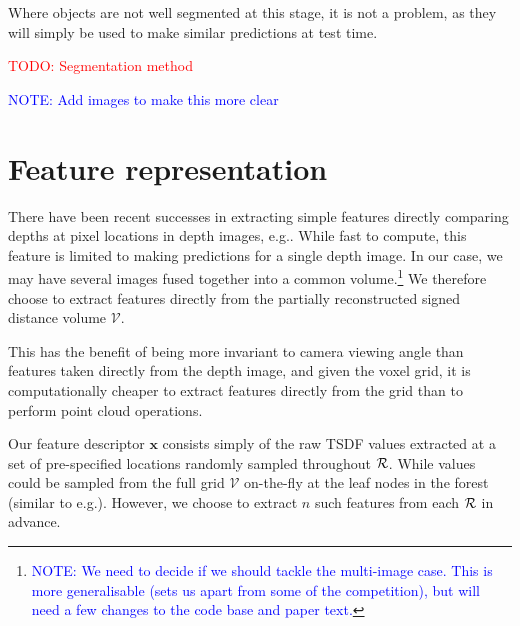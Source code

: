 \documentclass[10pt,twocolumn,letterpaper]{article}
\makeatletter
\renewcommand*{\eg}{e.g.\@\xspace}
\newcommand{\voxelgrid}{\mathcal{V}}
\newcommand{\todo}[1]{\textcolor{red}{TODO: #1}}
\newcommand{\note}[1]{\textcolor{blue}{NOTE: #1}}
\makeatother
\begin{document}
Where objects are not well segmented at this stage, it is not a problem, as they will simply be used to make similar predictions at test time.

\todo{Segmentation method}

\note{Add images to make this more clear}

\section{Feature representation}
\label{sec:features}

\newcommand{\scalfeat}{x}

There have been recent successes in extracting simple features directly comparing depths at pixel locations in depth images, \eg \cite{shotton-cvpr-2011}.
While fast to compute, this feature is limited to making predictions for a single depth image.
In our case, we may have several images fused together into a common volume.\footnote{\note{We need to decide if we should tackle the multi-image case. This is more generalisable (sets us apart from some of the competition), but will need a few changes to the code base and paper text.}}
We therefore choose to extract features directly from the partially reconstructed signed distance volume $\voxelgrid$.

This has the benefit of being more invariant to camera viewing angle than features taken directly from the depth image, and given the voxel grid, it is computationally cheaper to extract features directly from the grid than to perform point cloud operations.

Our feature descriptor $\mathbf{x}$ consists simply of the raw TSDF values extracted at a set of pre-specified locations randomly sampled throughout $\mathcal{R}$.
While values could be sampled from the full grid $\voxelgrid$ on-the-fly at the leaf nodes in the forest (similar to \eg \cite{shotton-cvpr-2011}).
However, we choose to extract $n$ such features from each $\mathcal{R}$ in advance.



\end{document}
